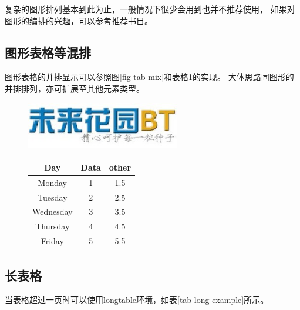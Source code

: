 复杂的图形排列基本到此为止，一般情况下很少会用到也并不推荐使用，
如果对图形的编排的兴趣，可以参考推荐书目。

\subsection{图形表格等混排}
\label{subsec-morefigtab}
图形表格的并排显示可以参照图\ref{fig-tab-mix}和表格\ref{tab-fig-mix}的实现。
大体思路同图形的并排排列，亦可扩展至其他元素类型。
\begin{figure}[h!]
    \begin{minipage}{0.5\textwidth}
        \centering
        \includegraphics[width=0.6\textwidth]{figure/fgbt.jpg}
        \label{fig-tab-mix}
    \end{minipage}
    \begin{minipage}{0.5\textwidth}
        \centering
        \begin{tabular}{c||c|c} \hline
            Day       & Data & other \\ \hline \hline
            Monday    & 1    & 1.5   \\
            Tuesday   & 2    & 2.5   \\
            Wednesday & 3    & 3.5   \\
            Thursday  & 4    & 4.5   \\
            Friday    & 5    & 5.5   \\ \hline
        \end{tabular}
        \label{tab-fig-mix}
    \end{minipage}
\end{figure}

\subsection{长表格}
\label{subsec-longtab}
当表格超过一页时可以使用longtable环境，如表\ref{tab-long-example}所示。

